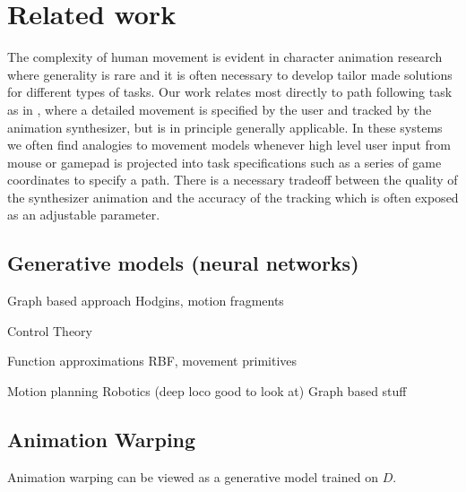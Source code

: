 \section{Related work}
The complexity of human movement is evident in character animation research where generality is rare and it is often necessary to develop tailor made solutions for different types of tasks. Our work relates most directly to path following task as in \citep{lee10}, \citep{holden.16} where a detailed movement is specified by the user and tracked by the animation synthesizer, but is in principle generally applicable. In these systems we often find analogies to movement models whenever high level user input from mouse or gamepad is projected into task specifications such as a series of game coordinates to specify a path. There is a necessary tradeoff between the quality of the synthesizer animation and the accuracy of the tracking which is often exposed as an adjustable parameter.





\subsection{Generative models (neural networks)}




Graph based approach 
    Hodgins, motion fragments

Control Theory

Function approximations 
    RBF, movement primitives

Motion planning
    Robotics (deep loco good to look at)
    Graph based stuff



\subsection{Animation Warping}
Animation warping can be viewed as a generative model trained on $D$. 


